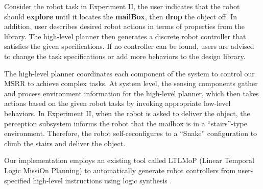 \documentclass[12pt]{article}
\begin{document}
Consider the robot task in Experiment II, the user indicates that the robot should \textbf{explore} until it locates the \textbf{mailBox}, then \textbf{drop} the object off.
In addition, user describes desired robot actions in terms of properties from the library.
The high-level planner then generates a discrete robot controller that satisfies the given specifications.
If no controller can be found, users are advised to change the task specifications or add more behaviors to the design library.

The high-level planner coordinates each component of the system to control our MSRR to achieve complex tasks.
At system level, the sensing components gather and process environment information for the high-level planner, which then takes actions based on the given robot tasks by invoking appropriate low-level behaviors.
In Experiment II, when the robot is asked to deliver the object, the perception subsystem informs the robot that the mailbox is in a ``stairs''-type environment.
Therefore, the robot self-reconfigures to a ``Snake'' configuration to climb the stairs and deliver the object.

Our implementation employs an existing tool called LTLMoP (Linear Temporal Logic MissiOn Planning) to automatically generate robot controllers from user-specified high-level instructions using logic synthesis \cite{DBLP:conf/iros/FinucaneJK10,DBLP:journals/trob/Kress-GazitFP09}.



\end{document}

